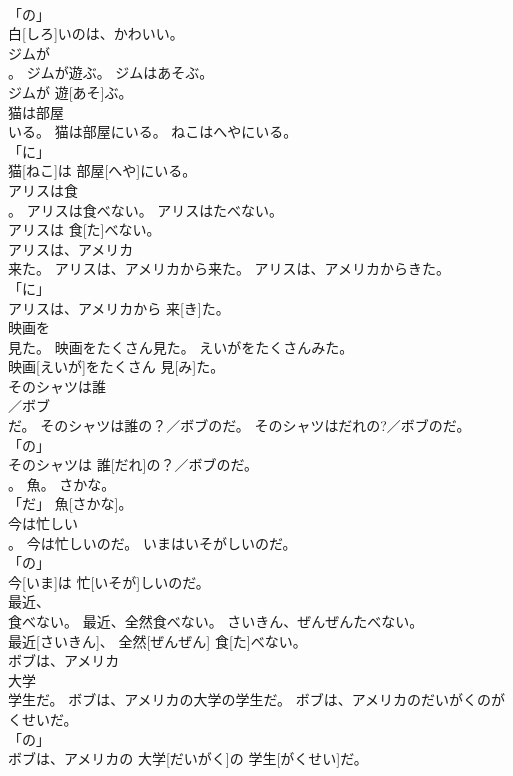 \documentclass[8pt]{extreport}
\begin{document}
\begin{CJK}{UTF8}{min}
\\	「の」 
\\	白[しろ]いのは、かわいい。		
\\	ジムが
\\	。	ジムが遊ぶ。	ジムはあそぶ。	
\\	ジムが 遊[あそ]ぶ。		
\\	猫は部屋
\\	いる。	猫は部屋にいる。	ねこはへやにいる。	
\\	「に」 
\\	猫[ねこ]は 部屋[へや]にいる。		
\\	アリスは食
\\	。	アリスは食べない。	アリスはたべない。	
\\	アリスは 食[た]べない。		
\\	アリスは、アメリカ
\\	来た。	アリスは、アメリカから来た。	アリスは、アメリカからきた。	
\\	「に」 
\\	アリスは、アメリカから 来[き]た。		
\\	映画を
\\	見た。	映画をたくさん見た。	えいがをたくさんみた。	
\\	映画[えいが]をたくさん 見[み]た。		
\\	そのシャツは誰
\\	／ボブ
\\	だ。	そのシャツは誰の？／ボブのだ。	そのシャツはだれの?／ボブのだ。	
\\	「の」 
\\	そのシャツは 誰[だれ]の？／ボブのだ。		
\\	。	魚。	さかな。	
\\	「だ」	魚[さかな]。		
\\	今は忙しい
\\	。	今は忙しいのだ。	いまはいそがしいのだ。	
\\	「の」 
\\	今[いま]は 忙[いそが]しいのだ。		
\\	最近、
\\	食べない。	最近、全然食べない。	さいきん、ぜんぜんたべない。	
\\	最近[さいきん]、 全然[ぜんぜん] 食[た]べない。		
\\	ボブは、アメリカ
\\	大学
\\	学生だ。	ボブは、アメリカの大学の学生だ。	ボブは、アメリカのだいがくのがくせいだ。	
\\	「の」 
\\	ボブは、アメリカの 大学[だいがく]の 学生[がくせい]だ。		

\end{CJK}
\end{document}
